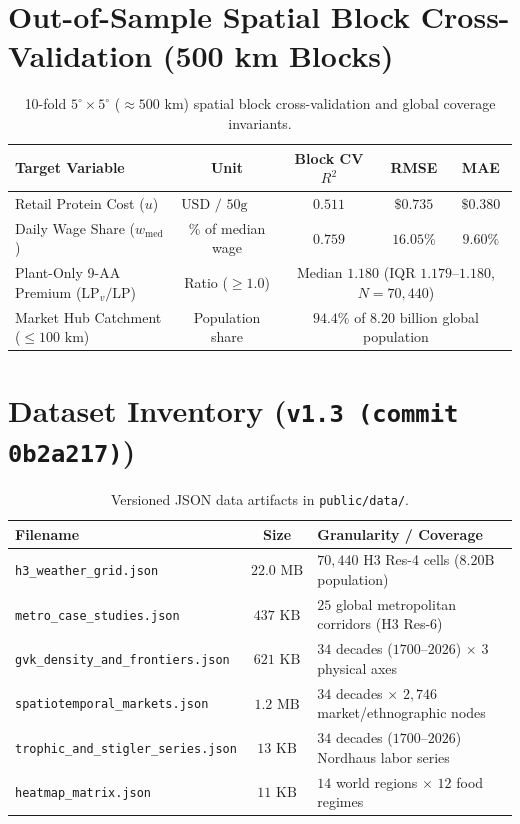 \documentclass[11pt,a4paper]{article}
\begin{document}
\section{Out-of-Sample Spatial Block Cross-Validation (500 km Blocks)}
\begin{table}[h!]
\centering
\caption{10-fold $5^\circ \times 5^\circ$ ($\approx 500\text{ km}$) spatial block cross-validation and global coverage invariants.}
\begin{tabular}{lcccc}
\toprule
\textbf{Target Variable} & \textbf{Unit} & \textbf{Block CV $R^2$} & \textbf{RMSE} & \textbf{MAE} \\
\midrule
Retail Protein Cost ($u$) & $\text{USD / 50g DIAAS}$ & $0.511$ & $\$0.735$ & $\$0.380$ \\
Daily Wage Share ($w_{\text{med}}$) & $\%$ of median wage & $0.759$ & $16.05\%$ & $9.60\%$ \\
Plant-Only 9-AA Premium ($\text{LP}_v/\text{LP}$) & Ratio ($\ge 1.0$) & \multicolumn{3}{c}{Median $1.180$ (IQR $1.179\text{--}1.180$, $N=70{,}440$)} \\
Market Hub Catchment ($\le 100\text{ km}$) & Population share & \multicolumn{3}{c}{$94.4\%$ of $8.20\text{ billion}$ global population} \\
\bottomrule
\end{tabular}
\end{table}

\section{Dataset Inventory (\texttt{v1.3 (commit 0b2a217)})}
\begin{table}[h!]
\centering
\caption{Versioned JSON data artifacts in \texttt{public/data/}.}
\begin{tabular}{lcl}
\toprule
\textbf{Filename} & \textbf{Size} & \textbf{Granularity / Coverage} \\
\midrule
\texttt{h3\_weather\_grid.json} & $22.0\text{ MB}$ & $70{,}440$ H3 Res-4 cells ($8.20\text{B}$ population) \\
\texttt{metro\_case\_studies.json} & $437\text{ KB}$ & $25$ global metropolitan corridors (H3 Res-6) \\
\texttt{gvk\_density\_and\_frontiers.json} & $621\text{ KB}$ & $34$ decades ($1700\text{--}2026$) $\times$ $3$ physical axes \\
\texttt{spatiotemporal\_markets.json} & $1.2\text{ MB}$ & $34$ decades $\times$ $2{,}746$ market/ethnographic nodes \\
\texttt{trophic\_and\_stigler\_series.json} & $13\text{ KB}$ & $34$ decades ($1700\text{--}2026$) Nordhaus labor series \\
\texttt{heatmap\_matrix.json} & $11\text{ KB}$ & $14$ world regions $\times$ $12$ food regimes \\
\bottomrule
\end{tabular}
\end{table}
\end{document}
